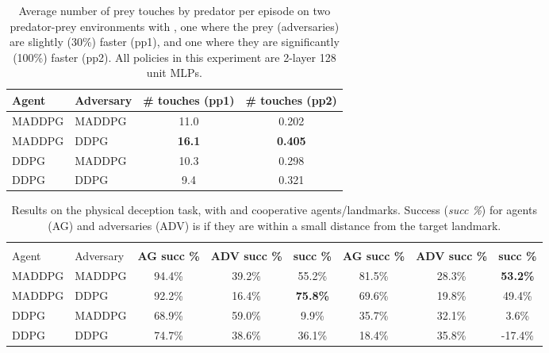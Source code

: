 \documentclass{article}
\begin{document}
\begin{table*}[ht!]
\small
\centering
\begin{tabular}{l l c c}
\toprule
Agent  & Adversary  & \textbf{\# touches ({\sc pp1}) }&    \textbf{\# touches ({\sc pp2})} \\ \hline
MADDPG & MADDPG & 11.0 & 0.202  \\
MADDPG & DDPG &  \textbf{16.1} & \textbf{0.405} \\
DDPG & MADDPG & 10.3  & 0.298  \\
DDPG & DDPG & 9.4 & 0.321  \\
\bottomrule
\end{tabular}
\caption{\label{tab:simple_tag} Average number of prey touches by predator per episode on two predator-prey environments with , one where the prey (adversaries) are slightly (30\%) faster ({\sc pp1}), and one where they are significantly (100\%) faster ({\sc pp2}). All policies in this experiment are 2-layer 128 unit MLPs. }
\end{table*}

\begin{table*}[ht!]
\fontsize{8.5}{9}\selectfont
\centering
\begin{tabular}{l l c c c c c c}
\toprule
 & & \multicolumn{3}{c}{ } & \multicolumn{3}{c}{ } \\
Agent  & Adversary  & \textbf{AG succ \% }&    \textbf{ADV succ \%}& \textbf{ succ \%}& \textbf{AG succ \% }&    \textbf{ADV succ \%}& \textbf{ succ \%} \\ \hline
MADDPG & MADDPG & 94.4\% & 39.2\% & 55.2\% & 81.5\% & 28.3\% & \textbf{53.2\%} \\
MADDPG & DDPG &  92.2\% & 16.4\% & \textbf{75.8\%} & 69.6\% & 19.8\% & 49.4\% \\
DDPG & MADDPG & 68.9\%  & 59.0\% & 9.9\% & 35.7\% & 32.1\% & 3.6\% \\
DDPG & DDPG & 74.7\%  & 38.6\% & 36.1\% & 18.4\% & 35.8\% & -17.4\% \\
\bottomrule
\end{tabular}
\caption{\label{tab:simple_adversary} Results on the physical deception task, with  and  cooperative agents/landmarks. Success (\textit{succ \%}) for agents (AG) and adversaries (ADV) is if they are within a small distance from the target landmark. }
\end{table*}
\end{document}
